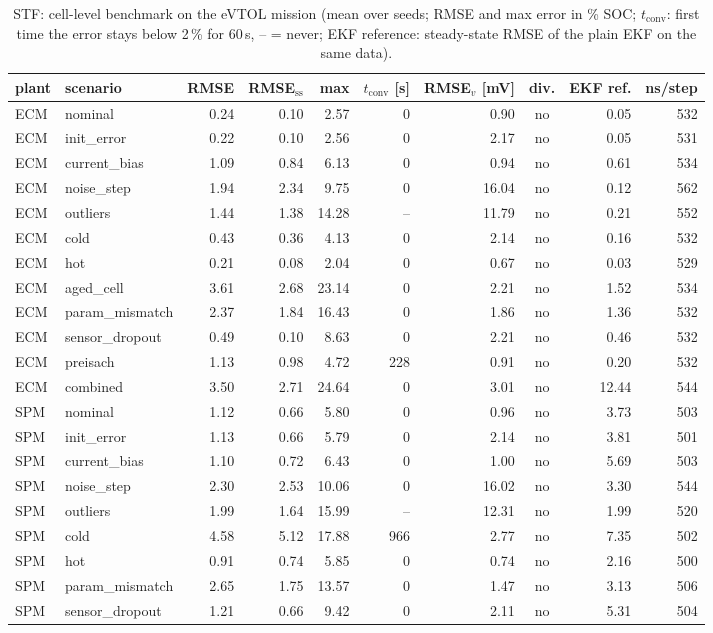 \begin{table}[H]\centering\footnotesize\setlength{\tabcolsep}{4pt}
\caption{STF: cell-level benchmark on the eVTOL mission (mean over seeds; RMSE and max error in \% SOC; $t_\mathrm{conv}$: first time the error stays below 2\,\% for 60\,s, -- = never; EKF reference: steady-state RMSE of the plain EKF on the same data).}\label{tab:cell_STF}
\begin{tabular}{llrrrrrcrr}\toprule
plant & scenario & RMSE & RMSE$_\mathrm{ss}$ & max & $t_\mathrm{conv}$ [s] & RMSE$_v$ [mV] & div. & EKF ref. & ns/step \\ \midrule
ECM & nominal & 0.24 & 0.10 & 2.57 & 0 & 0.90 & no & 0.05 & 532 \\
ECM & init\_error & 0.22 & 0.10 & 2.56 & 0 & 2.17 & no & 0.05 & 531 \\
ECM & current\_bias & 1.09 & 0.84 & 6.13 & 0 & 0.94 & no & 0.61 & 534 \\
ECM & noise\_step & 1.94 & 2.34 & 9.75 & 0 & 16.04 & no & 0.12 & 562 \\
ECM & outliers & 1.44 & 1.38 & 14.28 & -- & 11.79 & no & 0.21 & 552 \\
ECM & cold & 0.43 & 0.36 & 4.13 & 0 & 2.14 & no & 0.16 & 532 \\
ECM & hot & 0.21 & 0.08 & 2.04 & 0 & 0.67 & no & 0.03 & 529 \\
ECM & aged\_cell & 3.61 & 2.68 & 23.14 & 0 & 2.21 & no & 1.52 & 534 \\
ECM & param\_mismatch & 2.37 & 1.84 & 16.43 & 0 & 1.86 & no & 1.36 & 532 \\
ECM & sensor\_dropout & 0.49 & 0.10 & 8.63 & 0 & 2.21 & no & 0.46 & 532 \\
ECM & preisach & 1.13 & 0.98 & 4.72 & 228 & 0.91 & no & 0.20 & 532 \\
ECM & combined & 3.50 & 2.71 & 24.64 & 0 & 3.01 & no & 12.44 & 544 \\
\midrule
SPM & nominal & 1.12 & 0.66 & 5.80 & 0 & 0.96 & no & 3.73 & 503 \\
SPM & init\_error & 1.13 & 0.66 & 5.79 & 0 & 2.14 & no & 3.81 & 501 \\
SPM & current\_bias & 1.10 & 0.72 & 6.43 & 0 & 1.00 & no & 5.69 & 503 \\
SPM & noise\_step & 2.30 & 2.53 & 10.06 & 0 & 16.02 & no & 3.30 & 544 \\
SPM & outliers & 1.99 & 1.64 & 15.99 & -- & 12.31 & no & 1.99 & 520 \\
SPM & cold & 4.58 & 5.12 & 17.88 & 966 & 2.77 & no & 7.35 & 502 \\
SPM & hot & 0.91 & 0.74 & 5.85 & 0 & 0.74 & no & 2.16 & 500 \\
SPM & param\_mismatch & 2.65 & 1.75 & 13.57 & 0 & 1.47 & no & 3.13 & 506 \\
SPM & sensor\_dropout & 1.21 & 0.66 & 9.42 & 0 & 2.11 & no & 5.31 & 504 \\
\bottomrule\end{tabular}\end{table}

